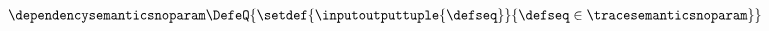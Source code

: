 
\begin{gather*}
  \dependencysemanticsnoparam \DefeQ \{\setdef{\inputoutputtuple{\defseq}}{\defseq\in\tracesemanticsnoparam}\}
\end{gather*}
